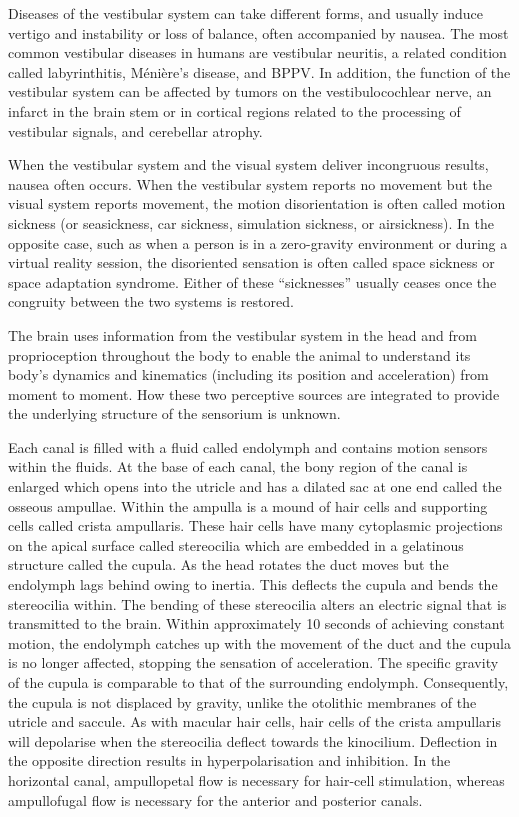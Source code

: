 Diseases of the vestibular system can take different forms, and usually induce vertigo and instability or loss of balance, often accompanied by nausea. The most common vestibular diseases in humans are vestibular neuritis, a related condition called labyrinthitis, Ménière's disease, and BPPV. In addition, the function of the vestibular system can be affected by tumors on the vestibulocochlear nerve, an infarct in the brain stem or in cortical regions related to the processing of vestibular signals, and cerebellar atrophy.

When the vestibular system and the visual system deliver incongruous results, nausea often occurs. When the vestibular system reports no movement but the visual system reports movement, the motion disorientation is often called motion sickness (or seasickness, car sickness, simulation sickness, or airsickness). In the opposite case, such as when a person is in a zero-gravity environment or during a virtual reality session, the disoriented sensation is often called space sickness or space adaptation syndrome. Either of these ``sicknesses'' usually ceases once the congruity between the two systems is restored.

The brain uses information from the vestibular system in the head and from proprioception throughout the body to enable the animal to understand its body's dynamics and kinematics (including its position and acceleration) from moment to moment. How these two perceptive sources are integrated to provide the underlying structure of the sensorium is unknown.

Each canal is filled with a fluid called endolymph and contains motion sensors within the fluids. At the base of each canal, the bony region of the canal is enlarged which opens into the utricle and has a dilated sac at one end called the osseous ampullae. Within the ampulla is a mound of hair cells and supporting cells called crista ampullaris. These hair cells have many cytoplasmic projections on the apical surface called stereocilia which are embedded in a gelatinous structure called the cupula. As the head rotates the duct moves but the endolymph lags behind owing to inertia. This deflects the cupula and bends the stereocilia within. The bending of these stereocilia alters an electric signal that is transmitted to the brain. Within approximately 10 seconds of achieving constant motion, the endolymph catches up with the movement of the duct and the cupula is no longer affected, stopping the sensation of acceleration. The specific gravity of the cupula is comparable to that of the surrounding endolymph. Consequently, the cupula is not displaced by gravity, unlike the otolithic membranes of the utricle and saccule. As with macular hair cells, hair cells of the crista ampullaris will depolarise when the stereocilia deflect towards the kinocilium. Deflection in the opposite direction results in hyperpolarisation and inhibition. In the horizontal canal, ampullopetal flow is necessary for hair-cell stimulation, whereas ampullofugal flow is necessary for the anterior and posterior canals.

